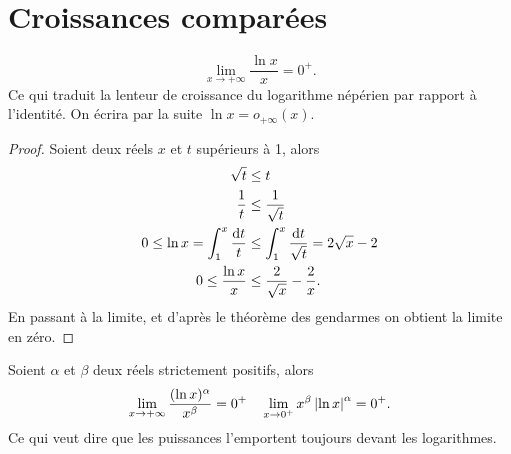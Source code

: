 \section{Croissances comparées}
\label{sec:chap1-croissancescomparees}
\begin{theo}
  \begin{equation}
    \lim\limits_{x \to +\infty} \frac{\ln x}{x}=0^+.
  \end{equation}
  Ce qui traduit la \og lenteur \fg{} de croissance du logarithme népérien par rapport à l'identité. On écrira par la suite $\ln x=o_{+\infty}(x)$.
\end{theo}
\begin{proof}
  Soient deux réels $x$ et $t$ supérieurs à 1, alors
  \begin{align}
    \sqrt{t} & \leq t \\
    \frac{1}{t} &\leq \frac{1}{\sqrt{t}}\\
    0 \leq \ln x = \int_{1}^{x} \frac{\mathop{}\mathopen{}\mathrm{d} t}{t} &\leq \int_1^x\frac{\mathop{}\mathopen{}\mathrm{d} t}{\sqrt{t}}=2\sqrt{x}-2\\
    0 \leq \frac{\ln x}{x} &\leq \frac{2}{\sqrt{x}} - \frac{2}{x}.
  \end{align}
  En passant à la limite, et d'après le théorème des gendarmes on obtient la limite en zéro.
\end{proof}
%
\begin{prop}
  \label{prop-chap1:croissancecomparelnpuissance}
  Soient $\alpha$ et $\beta$ deux réels strictement positifs, alors
  \begin{equation}
    \lim\limits_{x \to +\infty} \frac{(\ln x)^\alpha}{x^\beta} = 0^+ \quad \lim\limits_{x \to 0^+} x^\beta \left\lvert\ln x\right\rvert^\alpha=0^+.
  \end{equation}
  Ce qui veut dire que les puissances \og l'emportent \fg{} toujours devant les logarithmes.
\end{prop}
